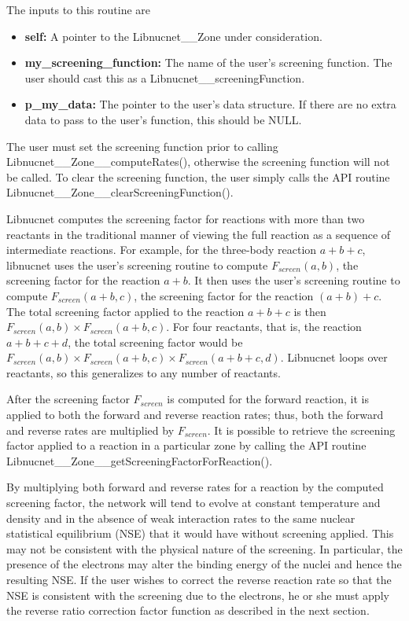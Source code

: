 \documentclass{article}    %
\begin{document}
The inputs to this routine are
\begin{itemize}

\item {\bf self:}  A pointer to the Libnucnet\_\_Zone under consideration.

\item {\bf my\_screening\_function:}  The name of the user's screening
function.  The user should cast this as a Libnucnet\_\_screeningFunction.

\item {\bf p\_my\_data:}  The pointer to the user's data structure.  If there
are no extra data to pass to the user's function, this should be NULL.
\end{itemize}

The user must set the screening function prior to calling
Libnucnet\_\_Zone\_\_computeRates(), otherwise the screening function will
not be called.  To clear the screening function, the user simply calls
the API routine Libnucnet\_\_Zone\_\_clearScreeningFunction().

Libnucnet computes the screening factor for reactions with more than two
reactants in the traditional manner of viewing the full reaction as a sequence
of intermediate reactions.  For example, for the three-body reaction
$a + b + c$, libnucnet uses the user's screening routine to compute
$F_{screen}(a,b)$, the screening factor for the reaction $a + b$.
It then uses the
user's screening routine to compute $F_{screen}(a+b,c)$,
the screening factor for
the reaction $(a + b) + c$.  The total screening factor applied to the
reaction $a + b + c$ is then $F_{screen}(a,b) \times F_{screen}(a+b,c)$.
For four reactants,
that is, the reaction $a + b + c + d$, the total screening factor would
be $F_{screen}(a,b) \times F_{screen}(a+b,c) \times F_{screen}(a+b+c,d)$.
Libnucnet loops over reactants,
so this generalizes to any number of reactants.

After the screening factor $F_{screen}$ is computed for the forward reaction,
it is applied to both the forward and reverse reaction rates; thus, both the
forward and reverse rates are multiplied by $F_{screen}$.
It is possible to retrieve the screening factor applied to a reaction
in a particular zone by calling the API routine
Libnucnet\_\_Zone\_\_getScreeningFactorForReaction().

By multiplying both forward and reverse rates for a reaction by the
computed screening factor,
the network will tend to evolve at constant temperature and density and
in the absence of weak interaction rates to the same nuclear statistical
equilibrium (NSE) that it would have
without screening applied.  This may not be consistent with the physical
nature of the screening.  In particular, the presence of the electrons
may alter the binding energy of the nuclei and hence the resulting NSE.
If the user wishes to correct the reverse
reaction rate so that the NSE is consistent with the screening due to the
electrons, he or she must apply the reverse ratio correction factor
function as described in the next section.
\end{document}
